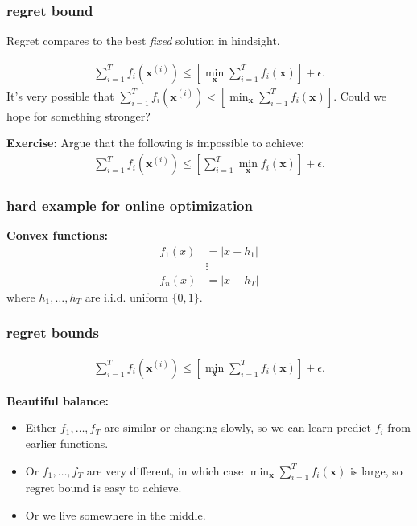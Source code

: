 \documentclass[compress]{beamer}
\newcommand{\bv}[1]{\mathbf{#1}}
\begin{document}
\begin{frame}[t]
	\frametitle{regret bound}
	\begin{center}
		Regret compares to the best \emph{fixed} solution in hindsight.
	\end{center}
	\begin{align*}
		\sum_{i=1}^T f_i(\bv{x}^{(i)}) \leq \left[\min_\bv{x} \sum_{i=1}^T f_i(\bv{x})\right] + \epsilon.
	\end{align*}
	It's very possible that $\sum_{i=1}^T f_i(\bv{x}^{(i)}) < \left[\min_\bv{x} \sum_{i=1}^T f_i(\bv{x})\right]$. Could we hope for something stronger?
	
	\textbf{Exercise:} Argue that the following is impossible to achieve:
	\begin{align*}
		\sum_{i=1}^T f_i(\bv{x}^{(i)}) \leq \left[\sum_{i=1}^T \min_\bv{x} f_i(\bv{x})\right] + \epsilon.
	\end{align*}
\end{frame}

\begin{frame}[t]
	\frametitle{hard example for online optimization}
	\textbf{Convex functions:}
	\begin{align*}
		f_1(x) &= |x - h_1|\\
		 &\vdots\\
		 f_n(x) &= |x - h_T|
	\end{align*}
where $h_1, \ldots, h_T$ are i.i.d. uniform $\{0,1\}$.
\end{frame}

\begin{frame}[t]
	\frametitle{regret bounds}
	\begin{align*}
		\sum_{i=1}^T f_i(\bv{x}^{(i)}) \leq \left[\min_\bv{x} \sum_{i=1}^T f_i(\bv{x})\right] + \epsilon.
	\end{align*}
	
	\textbf{Beautiful balance:}
	\begin{itemize}
		\item Either $f_1, \ldots, f_T$ are similar or changing slowly, so we can learn predict $f_i$ from earlier functions.
		\item Or $f_1, \ldots, f_T$  are very different, in which case $\min_\bv{x} \sum_{i=1}^T f_i(\bv{x})$ is large, so regret bound is easy to achieve. 
		\item Or we live somewhere in the middle.
	\end{itemize} 
\end{frame}
\end{document}
